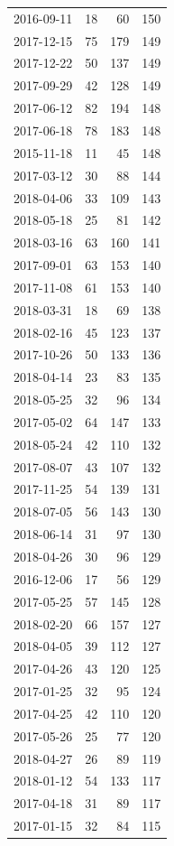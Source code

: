 \begin{tabular}{lrrr}
2016-09-11 & 18 & 60 & 150 \\
2017-12-15 & 75 & 179 & 149 \\
2017-12-22 & 50 & 137 & 149 \\
2017-09-29 & 42 & 128 & 149 \\
2017-06-12 & 82 & 194 & 148 \\
2017-06-18 & 78 & 183 & 148 \\
2015-11-18 & 11 & 45 & 148 \\
2017-03-12 & 30 & 88 & 144 \\
2018-04-06 & 33 & 109 & 143 \\
2018-05-18 & 25 & 81 & 142 \\
2018-03-16 & 63 & 160 & 141 \\
2017-09-01 & 63 & 153 & 140 \\
2017-11-08 & 61 & 153 & 140 \\
2018-03-31 & 18 & 69 & 138 \\
2018-02-16 & 45 & 123 & 137 \\
2017-10-26 & 50 & 133 & 136 \\
2018-04-14 & 23 & 83 & 135 \\
2018-05-25 & 32 & 96 & 134 \\
2017-05-02 & 64 & 147 & 133 \\
2018-05-24 & 42 & 110 & 132 \\
2017-08-07 & 43 & 107 & 132 \\
2017-11-25 & 54 & 139 & 131 \\
2018-07-05 & 56 & 143 & 130 \\
2018-06-14 & 31 & 97 & 130 \\
2018-04-26 & 30 & 96 & 129 \\
2016-12-06 & 17 & 56 & 129 \\
2017-05-25 & 57 & 145 & 128 \\
2018-02-20 & 66 & 157 & 127 \\
2018-04-05 & 39 & 112 & 127 \\
2017-04-26 & 43 & 120 & 125 \\
2017-01-25 & 32 & 95 & 124 \\
2017-04-25 & 42 & 110 & 120 \\
2017-05-26 & 25 & 77 & 120 \\
2018-04-27 & 26 & 89 & 119 \\
2018-01-12 & 54 & 133 & 117 \\
2017-04-18 & 31 & 89 & 117 \\
2017-01-15 & 32 & 84 & 115 \\

\end{tabular}
